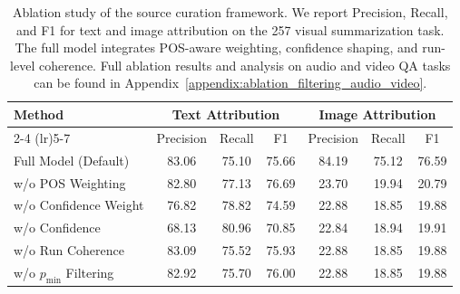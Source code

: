 \begin{table}[t]
\centering
\tablesize
\caption{
Ablation study of the source curation framework. 
We report Precision, Recall, and F1 for text and image attribution on the 257 visual summarization task.
The full model integrates POS-aware weighting, confidence shaping, and run-level coherence.
Full ablation results and analysis on audio and video QA tasks can be found in Appendix~\ref{appendix:ablation_filtering_audio_video}.
}
\label{tab:ablation_filtering}
\skiptablebegin
\setlength{\tabcolsep}{4pt}
\begin{tabular}{l|ccc|ccc}
\toprule
\multirow{2}{*}{\textbf{Method}} 
& \multicolumn{3}{c|}{\textbf{Text Attribution}} 
& \multicolumn{3}{c}{\textbf{Image Attribution}} \\
\cmidrule(lr){2-4} \cmidrule(lr){5-7}
& Precision & Recall & F1 
& Precision & Recall & F1 \\
\midrule
Full Model (Default) & 83.06 & 75.10 & 75.66 & 84.19 & 75.12 & 76.59 \\
\midrule
w/o POS Weighting & 82.80 & 77.13 & 76.69 & 23.70 & 19.94 & 20.79 \\
w/o Confidence Weight & 76.82 & 78.82 & 74.59 & 22.88 & 18.85 & 19.88 \\
w/o Confidence & 68.13 & 80.96 & 70.85 & 22.84 & 18.94 & 19.91 \\
w/o Run Coherence & 83.09 & 75.52 & 75.93 & 22.88 & 18.85 & 19.88 \\
w/o $p_{\min}$ Filtering & 82.92 & 75.70 & 76.00 & 22.88 & 18.85 & 19.88 \\
\bottomrule
\end{tabular}
\skiptableend
\end{table}